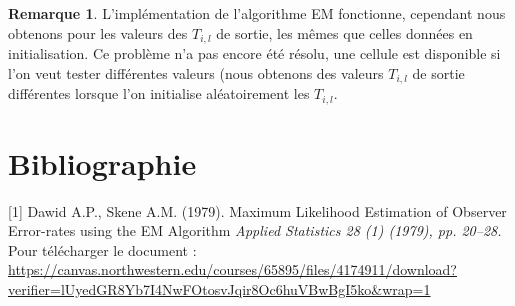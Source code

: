 \documentclass[frenchb]{report}
\newcommand{\1}{\mathbbm{1}}
\theoremstyle{definition}\newtheorem{defn}{Définition}
\theoremstyle{definition}\newtheorem{exm}{Exemple}
\theoremstyle{definition}\newtheorem{nota}{Notation}
\theoremstyle{definition}\newtheorem{rem}{Remarque}
\begin{document}
\begin{rem}
	L'implémentation de l'algorithme EM fonctionne, cependant nous obtenons pour les valeurs des $T_{i,l}$ de sortie, les mêmes que celles données en initialisation. Ce problème n'a pas encore été résolu, une cellule est disponible si l'on veut tester différentes valeurs (nous obtenons des valeurs $T_{i,l}$ de sortie différentes lorsque l'on initialise aléatoirement les $T_{i,l}$.
\end{rem}


\chapter{Bibliographie}

[1] Dawid A.P., Skene A.M. (1979).  Maximum Likelihood Estimation of Observer Error-rates using the EM Algorithm \textit{Applied Statistics 28 (1) (1979), pp. 20–28.}\newline
Pour télécharger le document : 
\url{https://canvas.northwestern.edu/courses/65895/files/4174911/download?verifier=lUyedGR8Yb7I4NwFOtosvJqir8Oc6huVBwBgI5ko&wrap=1}\newline %
\break
\end{document}
